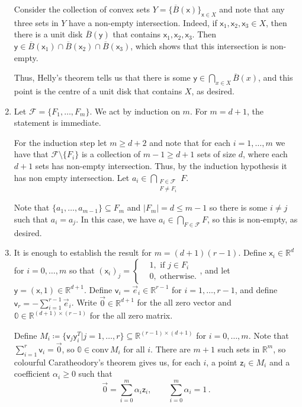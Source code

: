 \documentclass[kulak]{tplt}
\theoremstyle{definition}
\newcommand{\R}{\mathbb{R}}
\newcommand{\FF}{\mathcal F}
\newcommand{\vv}{\mathsf{v}}
\newcommand{\vx}{\mathsf{x}}
\newcommand{\vy}{\mathsf{y}}
\newcommand{\vz}{\mathsf{z}}
\newcommand{\conv}{\mathrm{conv}}
\begin{document}
\begin{enumerate}
Consider the collection of convex sets $Y = \{\overline{B}(\vx)\}_{\vx \in X}$ and note that any three sets in $Y$ have a non-empty intersection.
Indeed, if $\vx_1, \vx_2, \vx_3 \in X$, then there is a unit disk $\overline{B}(\vy)$ that contains $\vx_1, \vx_2, \vx_3$.
Then $\vy \in \overline{B}(\vx_1)\cap \overline{B}(\vx_2) \cap \overline{B}(\vx_3)$, which shows that this intersection is non-empty.

Thus, Helly's theorem tells us that there is some $\vy \in \bigcap_{x \in X} \overline{B}(x) $, and this point is the centre of a unit disk that contains $X$, as desired.


\item 
Let $\FF = \{F_1, \ldots, F_m\}$.
We act by induction on $m$.
For $m = d+1$, the statement is immediate.

For the induction step let $m \geq d+2$ and note that for each $i = 1, \ldots, m$ we have that $\FF \setminus  \{ F_i\} $ is a collection of $m-1\geq d+1$ sets of size $d$, where each $d+1$ sets has non-empty intersection.
Thus, by the induction hypothesis it has non empty intersection.
Let $a_i \in \bigcap_{\substack{ F \in \FF  \\ F \neq F_i }} F $.

Note that $\{a_1, \ldots, a_{m-1}\} \subseteq F_m$ and $|F_m| =d \leq m-1$ so there is some $i \neq j $ such that $a_i = a_j$.
In this case, we have $a_i \in \bigcap_{F \in \FF } F$, so this is non-empty, as desired.


\item 
It is enough to establish the result for $m = (d+1)(r-1)$.
Define $\vx_i \in \R^{d}$ for $i = 0, \ldots, m$ so that $(\vx_i)_j = \begin{cases}&1, \text{ if $j \in F_i$ } \\  &0, \text{ otherwise.}\end{cases}$, and let $\vy = (\vx, 1) \in \R^{d+1}$.
Define $\vv_i = \vec{e}_i \in\R^{r-1}$ for $i = 1, \ldots, r-1$, and define $\vv_r = - \sum_{i=1}^{r-1} \vec{e}_i$.
Write $\vec{0} \in\R^{d+1}$ for the all zero vector and $\mathbb{0} \in \R^{(d+1)\times (r-1)}$ for the all zero matrix.

Define $M_i \coloneqq \{\vv_j\vy^T_i | j=1, \ldots, r \} \subseteq \R^{(r-1) \times (d+1)}$ for $i = 0, \ldots, m$.
Note that $\sum_{i=1}^r \vv_i = \vec{0}$, so $\mathbb{0} \in \conv \, M_i$ for all $i$.
There are $m+1$ such sets in $\R^m$, so colourful Caratheodory's theorem gives us, for each $i$, a point $\vz_i\in M_i$ and a coefficient $\alpha_i\geq 0$ such that 
\begin{equation}\label{eq:col}
 \vec{0} = \sum_{i=0}^m \alpha_i \vz_i , \quad \quad \sum_{i=0}^m \alpha_i = 1\, . 
\end{equation}


\end{enumerate}
\end{document}
